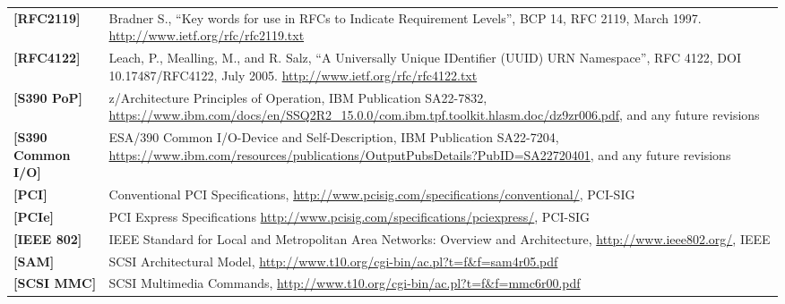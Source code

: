 \begin{longtable}{l p{5in}}
	\label{intro:rfc2119}\textbf{[RFC2119]} &
Bradner S., ``Key words for use in RFCs to Indicate Requirement
Levels'', BCP 14, RFC 2119, March 1997. \newline\url{http://www.ietf.org/rfc/rfc2119.txt}\\
	\label{intro:rfc4122}\textbf{[RFC4122]} &
Leach, P., Mealling, M., and R. Salz, ``A Universally Unique
IDentifier (UUID) URN Namespace'', RFC 4122, DOI 10.17487/RFC4122,
July 2005. \newline\url{http://www.ietf.org/rfc/rfc4122.txt}\\
	\label{intro:S390 PoP}\textbf{[S390 PoP]} & z/Architecture Principles of Operation, IBM Publication SA22-7832, \newline\url{https://www.ibm.com/docs/en/SSQ2R2_15.0.0/com.ibm.tpf.toolkit.hlasm.doc/dz9zr006.pdf}, and any future revisions\\
	\label{intro:S390 Common I/O}\textbf{[S390
Common I/O]} & ESA/390 Common I/O-Device and Self-Description, IBM Publication SA22-7204, \newline\url{https://www.ibm.com/resources/publications/OutputPubsDetails?PubID=SA22720401}, and any future revisions\\
	\label{intro:PCI}\textbf{[PCI]} &
	Conventional PCI Specifications,
	\newline\url{http://www.pcisig.com/specifications/conventional/},
	PCI-SIG\\
	\label{intro:PCIe}\textbf{[PCIe]} &
	PCI Express Specifications
	\newline\url{http://www.pcisig.com/specifications/pciexpress/},
	PCI-SIG\\
	\label{intro:IEEE 802}\textbf{[IEEE 802]} &
	IEEE Standard for Local and Metropolitan Area Networks: Overview and Architecture,
	\newline\url{http://www.ieee802.org/},
	IEEE\\
	\label{intro:SAM}\textbf{[SAM]} &
        SCSI Architectural Model,
        \newline\url{http://www.t10.org/cgi-bin/ac.pl?t=f&f=sam4r05.pdf}\\
	\label{intro:SCSI MMC}\textbf{[SCSI MMC]} &
        SCSI Multimedia Commands,
        \newline\url{http://www.t10.org/cgi-bin/ac.pl?t=f&f=mmc6r00.pdf}\\

\end{longtable}
